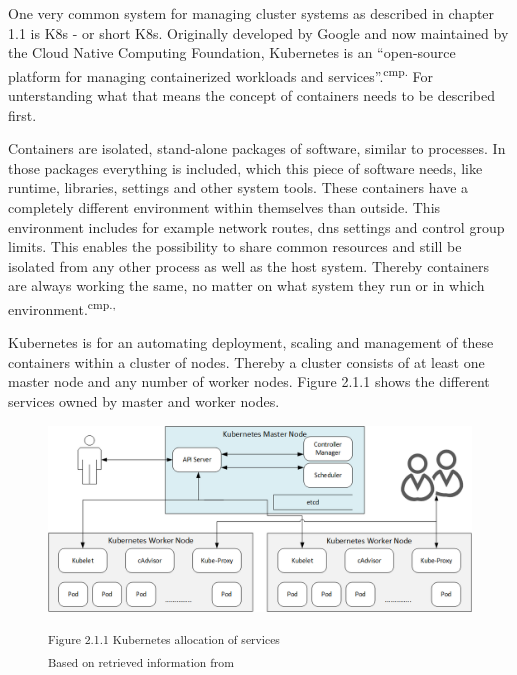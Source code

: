 One very common system for managing cluster systems as described in chapter 1.1 is \acl{K8s} - or short \acs{K8s}. Originally developed by Google and now maintained by the Cloud Native Computing Foundation, Kubernetes is an ``open-source platform for managing containerized workloads and services''.\textsuperscript{cmp.\cite{12}} For unterstanding what that means the concept of containers needs to be described first.


Containers are isolated, stand-alone packages of software, similar to processes. In those packages everything is included, which this piece of software needs, like runtime, libraries, settings and other system tools.  These containers have a completely different environment within themselves than outside. This environment includes for example network routes, dns settings and control group limits. This enables the possibility to share common resources and still be isolated from any other process as well as the host system. Thereby containers are always working the same, no matter on what system they run or in which environment.\textsuperscript{cmp.\cite{13}, \cite{14}}


Kubernetes is for an automating deployment, scaling and management of these containers within a cluster of nodes. Thereby a cluster consists of at least one master node and any number of worker nodes. Figure 2.1.1 shows the different services owned by master and worker nodes.

\begin{figure}[h]
\centering
\includegraphics[width=\textwidth/5*3]{images/kubernetes_service_allocation.png}

\textsuperscript{Figure 2.1.1 Kubernetes allocation of services}\\
\textsuperscript{Based on retrieved information from \cite{13}}
\end{figure}

